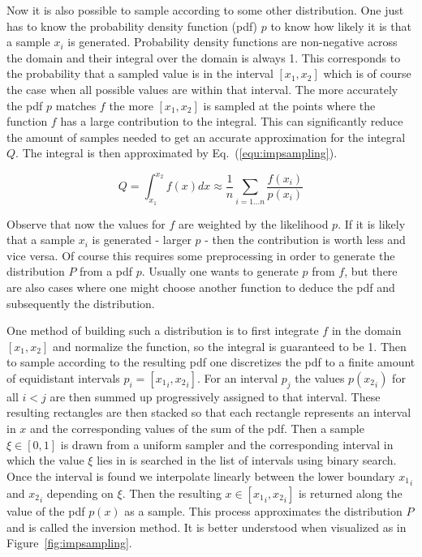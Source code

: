 \documentclass[a4paper,10pt]{article}
\newcommand{\equref}[1]{Eq.~(\ref{#1})}
\newcommand{\figref}[1]{Figure~\ref{#1}}
\begin{document}
    Now it is also possible to sample according to some other distribution.
    One just has to know the probability density function (pdf) $p$ to know
    how likely it is that a sample $x_i$ is generated.
    Probability density functions are non-negative across the domain
    and their integral over the domain is always 1.
    This corresponds to the probability that a sampled value is in the
    interval $[x_1, x_2]$ which is of course the case when all
    possible values are within that interval. 
    The more accurately the pdf $p$ matches $f$ the more $[x_1,x_2]$
    is sampled at the points where the function $f$ has a large contribution to
    the integral.
    This can significantly reduce the amount of samples needed to get an
    accurate approximation for the integral $Q$.
    The integral is then approximated by \equref{equ:impsampling}.

    \begin{equation}
        \label{equ:impsampling}
        Q = \int_{x_1}^{x_2} f(x) dx \approx \frac{1}{n} \sum_{i = 1...n} \frac{f(x_i)}{p(x_i)}
    \end{equation}

    Observe that now the values for $f$ are weighted by the likelihood $p$.
    If it is likely that a sample $x_i$ is generated - larger $p$ - then
    the contribution is worth less and vice versa.     
    Of course this requires some preprocessing in order to generate the
    distribution $P$ from a pdf $p$.
    Usually one wants to generate $p$ from $f$, but there are also 
    cases where one might choose another function to deduce the
    pdf and subsequently the distribution.

    One method of building such a distribution is to first integrate
    $f$ in the domain $[x_1, x_2]$ and normalize the function, so the
    integral is guaranteed to be 1.
    Then to sample according to the resulting pdf one discretizes the
    pdf to a finite amount of equidistant intervals $p_i = [{x_1}_i, {x_2}_i]$.
    For an interval $p_j$ the values $p({x_2}_i)$ for all $i < j$ are
    then summed up progressively assigned to that interval.
    These resulting rectangles are then stacked so that each rectangle
    represents an interval in $x$ and the corresponding values of the
    sum of the pdf.
    Then a sample $\xi \in [0,1]$ is drawn from a uniform sampler and
    the corresponding interval in which the value $\xi$ lies in is
    searched in the list of intervals using binary search.
    Once the interval is found we interpolate linearly between the
    lower boundary ${x_1}_i$ and ${x_2}_i$ depending on $\xi$.
    Then the resulting $x \in [{x_1}_i, {x_2}_i]$ is returned along
    the value of the pdf $p(x)$ as a sample.
    This process approximates the distribution $P$ and is called the
    inversion method. It is better understood when visualized as in
    \figref{fig:impsampling}. 
    
\end{document}
